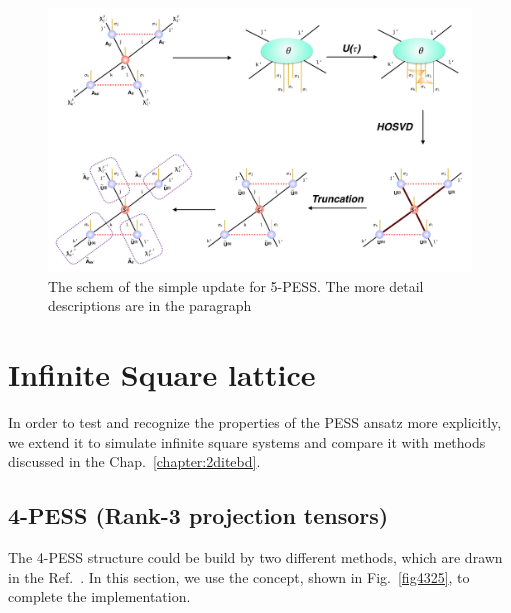 \begin{figure}[ht]
	\centering
	\includegraphics[width=1.00\textwidth]{figures/fig4324.png}
	\caption[The schem of the simple update for 5-PESS.]{The schem of the simple update for 5-PESS. The more detail descriptions are in the paragraph}
	\label{fig4324}
\end{figure}
\section{Infinite Square lattice}
\label{4pess2b}
In order to test and recognize the properties of the PESS ansatz more explicitly, we extend it to simulate infinite square systems and compare it with methods discussed in the Chap.~\ref{chapter:2ditebd}.

\subsection{4-PESS (Rank-3 projection tensors)}
The 4-PESS structure could be build by two different methods, which are drawn in the Ref.~\cite{PhysRevX.4.011025}. In this section, we use the concept, shown in Fig.~\ref{fig4325}, to complete the implementation. 

